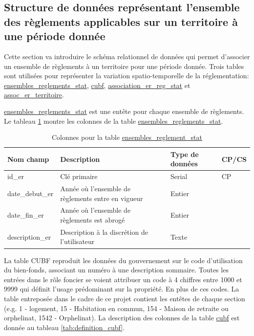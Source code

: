     \subsection{Structure de données représentant l'ensemble des règlements applicables sur un territoire à une période donnée} \label{sec:ensembles_association}
        Cette section va introduire le schéma relationnel de données qui permet d'associer un ensemble de règlements à un territoire pour une période donnée. Trois tables sont utilisées pour représenter la variation spatio-temporelle de la réglementation: \underline{ensembles\_reglements\_stat}, \underline{cubf}, \underline{association\_er\_reg\_stat} et \underline{assoc\_er\_territoire}.\par
        \underline{ensembles\_reglements\_stat} est une entête pour chaque ensemble de règlements. Le tableau \ref{tab:definition_er} montre les colonnes de la table \underline{ensembles\_reglements\_stat}. \par
        \begin{table}[h]
           \centering
           \begin{tabular}{m{}|m{}m{}m{}}
                \hline
                Nom champ & Description & Type de données & CP/CS  \\
                \hline
                id\_er & Clé primaire  & Serial & CP \\  
                date\_debut\_er & Année où l'ensemble de règlements entre en vigueur & Entier & \\
                date\_fin\_er & Année où l'ensemble de règlements est abrogé& Entier & \\
                description\_er & Description à la discrétion de l'utilisateur & Texte & \\
                \hline
           \end{tabular}
           \caption{Colonnes pour la table \underline{ensembles\_reglement\_stat}}
           \label{tab:definition_er}
       \end{table}   
       La table \ac{CUBF} reproduit les données du gouvernement sur le code d'utilisation du bien-fonds, associant un numéro à une description sommaire. Toutes les entrées dans le rôle foncier se voient attribuer un code à 4 chiffres entre 1000 et 9999 qui définit l'usage prédominant sur la propriété. En plus de ces codes. La table entreposée dans le cadre de ce projet contient les entêtes de chaque section (e.g. 1 - logement, 15 - Habitation en commun, 154 - Maison de retraite ou orphelinat, 1542 - Orphelinat). La description des colonnes de la table \underline{cubf} est donnée au tableau \ref{tab:definition_cubf}. \par
